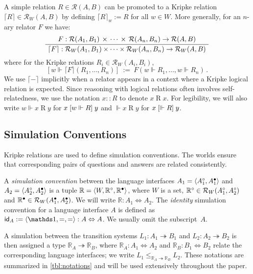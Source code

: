 A simple relation $R \in \mathcal{R}(A, B)$
can be promoted to a Kripke relation
$\lceil R \rceil \in \mathcal{R}_W(A, B)$
by defining $\lceil R \rceil_w := R$ for all $w \in W$.
More generally, for an $n$-ary relator $F$ we have:
\[
  \AxiomC{$
    F :
      \mathcal{R}(A_1, B_1) \,\times\,\cdots\,\times\,\mathcal{R}(A_n, B_n)
      \rightarrow \mathcal{R}(A, B)$}
  \UnaryInfC{$
    \lceil F \rceil :
      \mathcal{R}_W(A_1, B_1) \times \cdots \times \mathcal{R}_W(A_n, B_n)
      \rightarrow \mathcal{R}_W(A, B)$}
  \DisplayProof
\]
where for the Kripke relations $R_i \in \mathcal{R}_W(A_i, B_i)$,
\[
  [w \Vdash \lceil F \rceil (R_1, \ldots, R_n)] \: := \:
    F(w \Vdash R_1, \ldots, w \Vdash R_n)
  \,.
\]
We use $\lceil - \rceil$ implicitly
when a relator appears in a context where
a Kripke logical relation is expected.
Since reasoning with logical relations
often involves self-relatedness,
we use the notation
$x :: R$ to denote $x \mathrel{R} x$.
For legibility, we will also write
$w \Vdash x \mathrel{R} y$ for $x \mathrel{[{w \Vdash R}]} y$
and $\Vdash x \mathrel{R} y$ for $x \mathrel{[{\Vdash R}]} y$.


\subsection{Simulation Conventions} \label{sec:simconv} %

Kripke relations are used
to define simulation conventions.
The worlds ensure that corresponding pairs of
questions and answers are related consistently.

\begin{definition} \label{def:simconv} %
A \emph{simulation convention} between the language interfaces
$A_1 = \langle A_1^\circ, A_1^\bullet \rangle$ and
$A_2 = \langle A_2^\circ, A_2^\bullet \rangle$
is a tuple $\mathbb{R} = \langle W, \mathbb{R}^\circ, \mathbb{R}^\bullet \rangle$,
where $W$ is a set,
$\mathbb{R}^\circ \in \mathcal{R}_W(A_1^\circ, A_2^\circ)$
and $\mathbb{R}^\bullet \in \mathcal{R}_W(A_1^\bullet, A_2^\bullet)$.
We will write $\mathbb{R} : A_1 \Leftrightarrow A_2$.
The \emph{identity} simulation convention
for a language interface $A$
is defined as
$\kw{id}_A := \langle \unitset, {=}, {=} \rangle
  : A \Leftrightarrow A$.
We usually omit the subscript~$A$.
\end{definition}

A simulation between the transition systems
$L_1 : A_1 \twoheadrightarrow B_1$ and
$L_2 : A_2 \twoheadrightarrow B_2$
is then assigned a type $\mathbb{R}_A \twoheadrightarrow \mathbb{R}_B$,
where %
$\mathbb{R}_A : A_1 \Leftrightarrow A_2$ and
$\mathbb{R}_B : B_1 \Leftrightarrow B_2$
relate the corresponding language interfaces;
we write
$L_1 \le_{\mathbb{R}_A \twoheadrightarrow \mathbb{R}_B} L_2$.
These notations are summarized in \ref{tbl:notations}
and will be used extensively throughout the paper.

